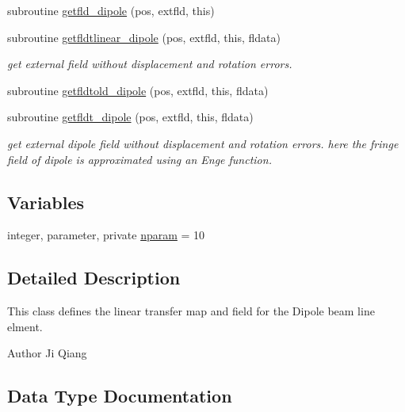 \begin{DoxyCompactItemize}
subroutine \mbox{\hyperlink{namespacedipoleclass_ac8c755e07904e113f223ee5ef029ac93}{getfld\+\_\+dipole}} (pos, extfld, this)
\item 
subroutine \mbox{\hyperlink{namespacedipoleclass_a9913f632a53ea9454402dd0a7932d70a}{getfldtlinear\+\_\+dipole}} (pos, extfld, this, fldata)
\begin{DoxyCompactList}\small\item\em get external field without displacement and rotation errors. \end{DoxyCompactList}\item 
subroutine \mbox{\hyperlink{namespacedipoleclass_a2897764d70f631133a41bf4ae8a1844a}{getfldtold\+\_\+dipole}} (pos, extfld, this, fldata)
\item 
subroutine \mbox{\hyperlink{namespacedipoleclass_af86cd228552505ad1c64928bb918f500}{getfldt\+\_\+dipole}} (pos, extfld, this, fldata)
\begin{DoxyCompactList}\small\item\em get external dipole field without displacement and rotation errors. here the fringe field of dipole is approximated using an Enge function. \end{DoxyCompactList}\end{DoxyCompactItemize}
\subsection*{Variables}
\begin{DoxyCompactItemize}
\item 
integer, parameter, private \mbox{\hyperlink{namespacedipoleclass_abc619199e1e9a2811da9e97630125da3}{nparam}} = 10
\end{DoxyCompactItemize}


\subsection{Detailed Description}
This class defines the linear transfer map and field for the Dipole beam line elment. 

\begin{DoxyAuthor}{Author}
Ji Qiang 
\end{DoxyAuthor}


\subsection{Data Type Documentation}
\label{structdipoleclass_1_1dipole}

